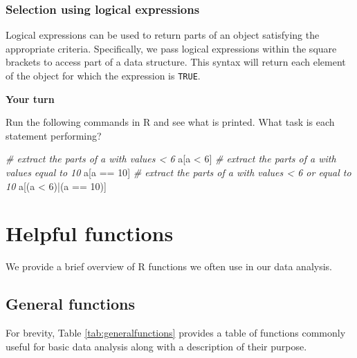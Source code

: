 \documentclass[
]{book}
\newenvironment{Shaded}{\begin{snugshade}}{\end{snugshade}}
\newcommand{\CommentTok}[1]{\textcolor[rgb]{0.56,0.35,0.01}{\textit{#1}}}
\newcommand{\DecValTok}[1]{\textcolor[rgb]{0.00,0.00,0.81}{#1}}
\newcommand{\NormalTok}[1]{#1}
\newcommand{\SpecialCharTok}[1]{\textcolor[rgb]{0.00,0.00,0.00}{#1}}
\theoremstyle{definition}
\theoremstyle{definition}
\theoremstyle{definition}
\theoremstyle{definition}
\theoremstyle{remark}
\begin{document}
\hypertarget{selection-using-logical-expressions}{%
\subsubsection{Selection using logical expressions}\label{selection-using-logical-expressions}}

Logical expressions can be used to return parts of an object satisfying the appropriate criteria. Specifically, we pass logical expressions within the square brackets to access part of a data structure. This syntax will return each element of the object for which the expression is \texttt{TRUE}.

\begin{yourturn}

\textbf{Your turn}

Run the following commands in R and see what is printed. What task is each statement performing?

\begin{Shaded}
\begin{Highlighting}[]
\CommentTok{\# extract the parts of a with values \textless{} 6}
\NormalTok{a[a }\SpecialCharTok{\textless{}} \DecValTok{6}\NormalTok{]}
\CommentTok{\# extract the parts of a with values equal to 10}
\NormalTok{a[a }\SpecialCharTok{==} \DecValTok{10}\NormalTok{]}
\CommentTok{\# extract the parts of a with values \textless{} 6 or equal to 10}
\NormalTok{a[(a }\SpecialCharTok{\textless{}} \DecValTok{6}\NormalTok{)}\SpecialCharTok{|}\NormalTok{(a }\SpecialCharTok{==} \DecValTok{10}\NormalTok{)]}
\end{Highlighting}
\end{Shaded}

\end{yourturn}

\hypertarget{helpful-functions}{%
\section{Helpful functions}\label{helpful-functions}}

We provide a brief overview of R functions we often use in our data analysis.

\hypertarget{general-functions}{%
\subsection{General functions}\label{general-functions}}

For brevity, Table \ref{tab:generalfunctions} provides a table of functions commonly useful for basic data analysis along with a description of their purpose.
\end{document}
